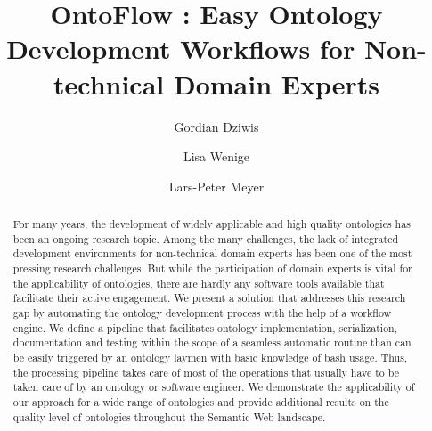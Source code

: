 \documentclass[sigconf]{acmart}
\begin{document}
\title{OntoFlow : Easy Ontology Development Workflows for Non-technical Domain Experts}

\author{Gordian Dziwis}
\authornote{}
\author{Lisa Wenige}
\authornotemark[1]
\author{Lars-Peter Meyer}
\authornotemark[1]

\renewcommand{\shortauthors}{Dziwis and Wenige et al.}

\begin{abstract}
  For many years, the development of widely applicable and high quality ontologies has been an ongoing research topic. Among the many challenges, the lack of integrated development environments for non-technical domain experts has been one of the most pressing research challenges. But while the participation of domain experts is vital for the applicability of ontologies, there are hardly any software tools available that facilitate their active engagement. We present a solution that addresses this research gap by automating the ontology development process with the help of a workflow engine. We define a pipeline that facilitates ontology implementation, serialization, documentation and testing within the scope of a seamless automatic routine than can be easily triggered by an ontology laymen with basic knowledge of bash usage. Thus, the processing pipeline takes care of most of the operations that usually have to be taken care of by an ontology or software engineer. We demonstrate the applicability of our approach for a wide range of ontologies and provide additional results on the quality level of ontologies throughout the Semantic Web landscape.
\end{abstract}
\end{document}
